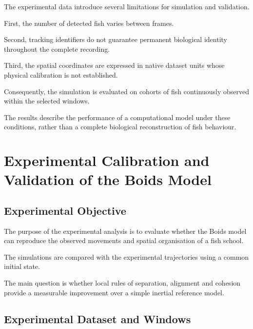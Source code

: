 \documentclass[10pt,a4paper]{article}
\newcommand{\esp}{\vspace*{2\bigskipamount}}
\begin{document}
The experimental data introduce several
limitations for simulation and validation.

First, the number of detected fish varies
between frames.

Second, tracking identifiers do not guarantee
permanent biological identity throughout
the complete recording.

Third, the spatial coordinates are expressed
in native dataset units whose physical
calibration is not established.

Consequently, the simulation is evaluated
on cohorts of fish continuously observed
within the selected windows.

The results describe the performance
of a computational model under these
conditions, rather than a complete
biological reconstruction of fish behaviour.

\esp



\section{Experimental Calibration and Validation
of the Boids Model}
\label{app:boids-validation}

\subsection{Experimental Objective}

The purpose of the experimental analysis
is to evaluate whether the Boids model
can reproduce the observed movements
and spatial organisation of a fish school.

The simulations are compared with
the experimental trajectories using
a common initial state.

The main question is whether local rules
of separation, alignment and cohesion
provide a measurable improvement over
a simple inertial reference model.

\subsection{Experimental Dataset and Windows}
\end{document}
